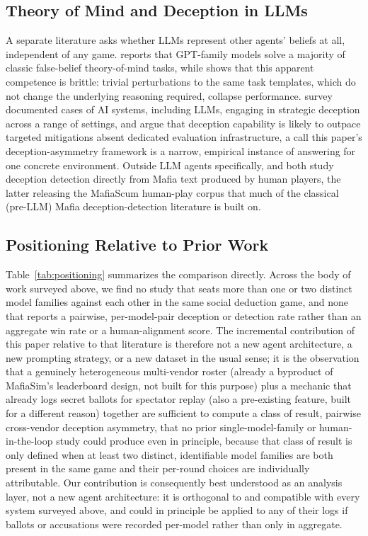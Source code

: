 \documentclass{article}
\begin{document}
\subsection{Theory of Mind and Deception in LLMs}

A separate literature asks whether LLMs represent other agents' beliefs at all, independent of any game. \citet{kosinski2023theory} reports that GPT-family models solve a majority of classic false-belief theory-of-mind tasks, while \citet{ullman2023large} shows that this apparent competence is brittle: trivial perturbations to the same task templates, which do not change the underlying reasoning required, collapse performance. \citet{park2023aideception} survey documented cases of AI systems, including LLMs, engaging in strategic deception across a range of settings, and argue that deception capability is likely to outpace targeted mitigations absent dedicated evaluation infrastructure, a call this paper's deception-asymmetry framework is a narrow, empirical instance of answering for one concrete environment. Outside LLM agents specifically, \citet{ibraheem2022putting} and \citet{deruiter2018mafiascum} both study deception detection directly from Mafia text produced by human players, the latter releasing the MafiaScum human-play corpus that much of the classical (pre-LLM) Mafia deception-detection literature is built on.

\subsection{Positioning Relative to Prior Work}
\label{sec:positioning}

Table~\ref{tab:positioning} summarizes the comparison directly. Across the body of work surveyed above, we find no study that seats more than one or two distinct model families against each other in the same social deduction game, and none that reports a pairwise, per-model-pair deception or detection rate rather than an aggregate win rate or a human-alignment score. The incremental contribution of this paper relative to that literature is therefore not a new agent architecture, a new prompting strategy, or a new dataset in the usual sense; it is the observation that a genuinely heterogeneous multi-vendor roster (already a byproduct of MafiaSim's leaderboard design, not built for this purpose) plus a mechanic that already logs secret ballots for spectator replay (also a pre-existing feature, built for a different reason) together are sufficient to compute a class of result, pairwise cross-vendor deception asymmetry, that no prior single-model-family or human-in-the-loop study could produce even in principle, because that class of result is only defined when at least two distinct, identifiable model families are both present in the same game and their per-round choices are individually attributable. Our contribution is consequently best understood as an analysis layer, not a new agent architecture: it is orthogonal to and compatible with every system surveyed above, and could in principle be applied to any of their logs if ballots or accusations were recorded per-model rather than only in aggregate.
\end{document}
